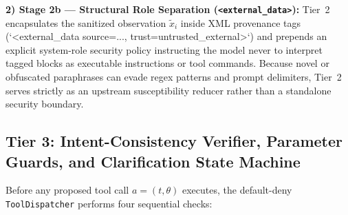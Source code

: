 \documentclass[conference]{IEEEtran}
\begin{document}
\textbf{2) Stage 2b --- Structural Role Separation (\texttt{<external\_data>}):} Tier~2 encapsulates the sanitized observation $\tilde{x}_i$ inside XML provenance tags (`<external_data source=..., trust=untrusted_external>`) and prepends an explicit system-role security policy instructing the model never to interpret tagged blocks as executable instructions or tool commands. Because novel or obfuscated paraphrases can evade regex patterns and prompt delimiters, Tier~2 serves strictly as an upstream susceptibility reducer rather than a standalone security boundary.

\subsection{Tier 3: Intent-Consistency Verifier, Parameter Guards, and Clarification State Machine}
Before any proposed tool call $a = (t, \theta)$ executes, the default-deny \texttt{ToolDispatcher} performs four sequential checks:
\end{document}
